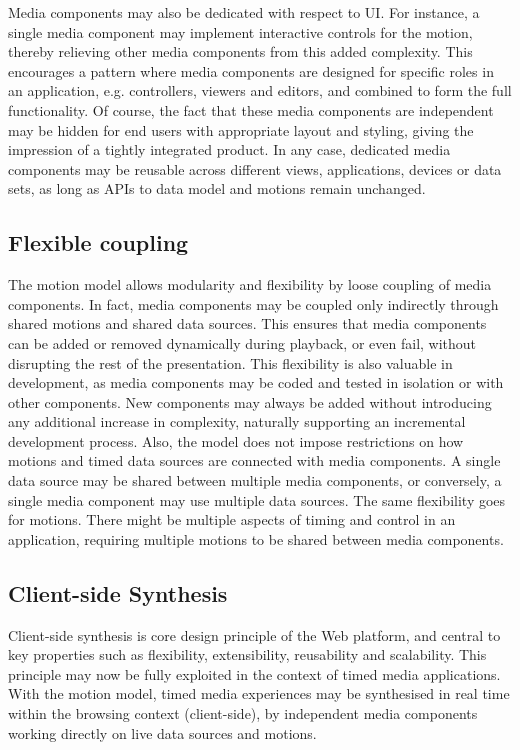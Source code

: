 \documentclass[graybox]{svmult}
\begin{document}
Media components may also be dedicated with respect to UI. For instance, a
single media component may implement interactive controls for the motion,
thereby relieving other media components from this added complexity. This
encourages a pattern where media components are designed for specific roles in
an application, e.g. controllers, viewers and editors, and combined to form
the full functionality. Of course, the fact that these media components are
independent may be hidden for end users with appropriate layout and styling,
giving the impression of a tightly integrated product. In any case, dedicated
media components may be reusable across different views, applications, devices
or data sets, as long as APIs to data model and motions remain unchanged.

\subsection{Flexible coupling}

The motion model allows modularity and flexibility by loose coupling of media
components. In fact, media components may be coupled only indirectly through
shared motions and shared data sources. This ensures that media components can
be added or removed dynamically during playback, or even fail, without
disrupting the rest of the presentation. This flexibility is also valuable in
development, as media components may be coded and tested in isolation or with
other components. New components may always be added without introducing any
additional increase in complexity, naturally supporting an incremental
development process. Also, the model does not impose restrictions on how
motions and timed data sources are connected with media components. A single
data source may be shared between multiple media components, or conversely, a
single media component may use multiple data sources. The same flexibility
goes for motions. There might be multiple aspects of timing and control in an
application, requiring multiple motions to be shared between media components.


\subsection{Client-side Synthesis}

Client-side synthesis is core design principle of the Web platform, and
central to key properties such as flexibility, extensibility, reusability and
scalability. This principle may now be fully exploited in the context of timed
media applications. With the motion model, timed media experiences
may be synthesised in real time within the browsing context (client-side), by
independent media components working directly on live data sources and
motions.
\end{document}
